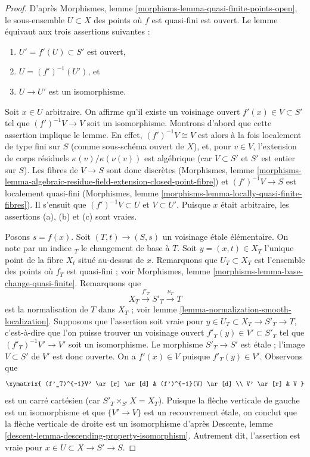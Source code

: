 \begin{proof}
D'après Morphismes, lemme \ref{morphisms-lemma-quasi-finite-points-open},
le sous-ensemble $U \subset X$ des points où $f$ est quasi-fini est ouvert.
Le lemme équivaut aux trois assertions suivantes :
\begin{enumerate}
\item[(a)] $U' = f'(U) \subset S'$ est ouvert,
\item[(b)] $U = (f')^{-1}(U')$, et
\item[(c)] $U \to U'$ est un isomorphisme.
\end{enumerate}
Soit $x \in U$ arbitraire. On affirme qu'il existe un voisinage ouvert
$f'(x) \in V \subset S'$ tel que $(f')^{-1}V \to V$ soit un
isomorphisme. Montrons d'abord que cette assertion implique le lemme.
En effet, $(f')^{-1}V \cong V$ est alors à la fois localement de type
fini sur $S$ (comme sous-schéma ouvert de $X$), et, pour $v \in V$, l'extension de corps
résiduels $\kappa(v)/\kappa(\nu(v))$ est algébrique (car
$V \subset S'$ et $S'$ est entier sur $S$). Les fibres
de $V \to S$ sont donc discrètes (Morphismes, lemme
\ref{morphisms-lemma-algebraic-residue-field-extension-closed-point-fibre})
et $(f')^{-1}V \to S$ est localement quasi-fini
(Morphismes, lemme \ref{morphisms-lemma-locally-quasi-finite-fibres}).
Il s'ensuit que $(f')^{-1}V \subset U$ et $V \subset U'$. Puisque $x$ était
arbitraire, les assertions (a), (b) et (c) sont vraies.

\medskip\noindent
Posons $s = f(x)$. Soit $(T, t) \to (S, s)$ un voisinage \'etale
élémentaire. On note par un indice ${}_T$ le changement de base à $T$.
Soit $y = (x, t) \in X_T$ l'unique point de
la fibre $X_t$ situé au-dessus de $x$. Remarquons que $U_T \subset X_T$
est l'ensemble des points où $f_T$ est quasi-fini ; voir
Morphismes, lemme \ref{morphisms-lemma-base-change-quasi-finite}.
Remarquons que
$$
X_T \xrightarrow{f'_T} S'_T \xrightarrow{\nu_T} T
$$
est la normalisation de $T$ dans $X_T$ ; voir
lemme \ref{lemma-normalization-smooth-localization}.
Supposons que l'assertion soit vraie pour $y \in U_T \subset X_T \to S'_T \to T$, c'est-à-dire
que l'on puisse trouver un voisinage ouvert
$f'_T(y) \in V' \subset S'_T$ tel que $(f'_T)^{-1}V' \to V'$ soit un
isomorphisme. Le morphisme $S'_T \to S'$ est \'etale ; l'image
$V \subset S'$ de $V'$ est donc ouverte. On a $f'(x) \in V$ puisque $f'_T(y) \in V'$.
Observons que
$$
\xymatrix{
(f'_T)^{-1}V' \ar[r] \ar[d] & (f')^{-1}(V) \ar[d] \\
V' \ar[r] & V
}
$$
est un carré cartésien (car $S'_T \times_{S'} X = X_T$).
Puisque la flèche verticale de gauche est un isomorphisme
et que $\{V' \to V\}$ est un recouvrement \'etale, on conclut que la flèche verticale de droite
est un isomorphisme d'après
Descente, lemme \ref{descent-lemma-descending-property-isomorphism}.
Autrement dit, l'assertion est vraie pour $x \in U \subset X \to S' \to S$.


\end{proof}
